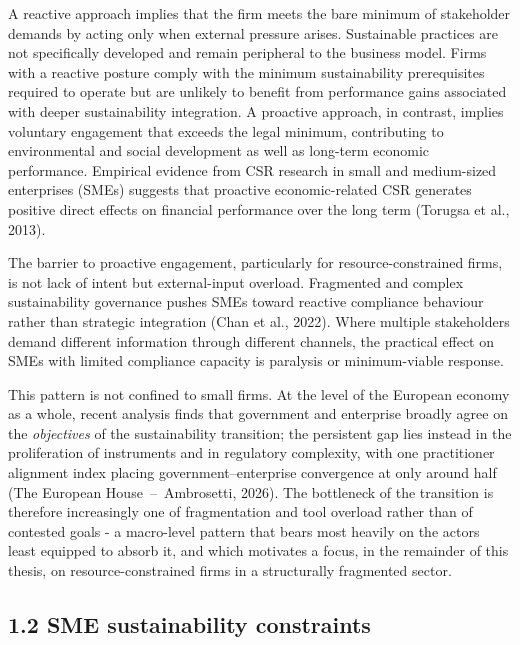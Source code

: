 \documentclass[
]{article}
\begin{document}
A reactive approach implies that the firm meets the bare minimum of
stakeholder demands by acting only when external pressure arises.
Sustainable practices are not specifically developed and remain
peripheral to the business model. Firms with a reactive posture comply
with the minimum sustainability prerequisites required to operate but
are unlikely to benefit from performance gains associated with deeper
sustainability integration. A proactive approach, in contrast, implies
voluntary engagement that exceeds the legal minimum, contributing to
environmental and social development as well as long-term economic
performance. Empirical evidence from CSR research in small and
medium-sized enterprises (SMEs) suggests that proactive economic-related
CSR generates positive direct effects on financial performance over the
long term (Torugsa et al., 2013).

The barrier to proactive engagement, particularly for
resource-constrained firms, is not lack of intent but external-input
overload. Fragmented and complex sustainability governance pushes SMEs
toward reactive compliance behaviour rather than strategic integration
(Chan et al., 2022). Where multiple stakeholders demand different
information through different channels, the practical effect on SMEs
with limited compliance capacity is paralysis or minimum-viable
response.

This pattern is not confined to small firms. At the level of the European
economy as a whole, recent analysis finds that government and enterprise
broadly agree on the \emph{objectives} of the sustainability transition;
the persistent gap lies instead in the proliferation of instruments and in
regulatory complexity, with one practitioner alignment index placing
government--enterprise convergence at only around half
(The European House~--~Ambrosetti, 2026).%
The bottleneck of the transition is therefore increasingly one of
fragmentation and tool overload rather than of contested goals - a
macro-level pattern that bears most heavily on the actors least equipped
to absorb it, and which motivates a focus, in the remainder of this
thesis, on resource-constrained firms in a structurally fragmented
sector.

\subsection{1.2 SME sustainability
constraints}\label{sme-sustainability-constraints}
\end{document}
